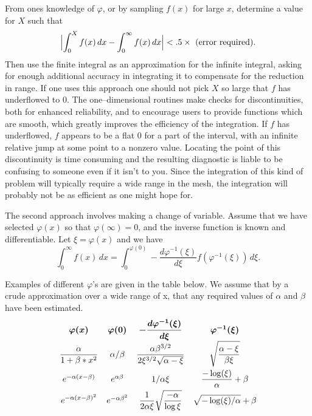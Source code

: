 \documentclass[twoside]{MATH77}
\begin{document}
From ones knowledge of $\varphi $, or by sampling $f(x)$ for large $x$,
determine a value for $X$ such that
\begin{equation*}
\Bigl| \int_0^X f(x)\,dx - \int_0^\infty f(x)\,dx \Bigr| < .5
\times \text{ (error required).}
\end{equation*}
Then use the finite integral as an approximation for the infinite
integral, asking for enough additional accuracy in integrating it to
compensate for the reduction in range.  If one uses this approach one
should not pick $X$ so large that $f$ has underflowed to 0.  The
one--dimensional routines make checks for discontinuities, both for
enhanced reliability, and to encourage users to provide functions
which are smooth, which greatly improves the efficiency of the
integration.  If $f$ has underflowed, $f$ appears to be a flat 0 for
a part of the interval, with an infinite relative jump at some point
to a nonzero value.  Locating the point of this discontinuity is time
consuming and the resulting diagnostic is liable to be confusing to
someone even if it isn't to you.  Since the integration of this kind
of problem will typically require a wide range in the mesh, the
integration will probably not be as efficient as one might hope for.

The second approach involves making a change of variable.  Assume that
we have selected $\varphi (x)$ so that $\varphi (\infty) = 0$, and the
inverse function is known and differentiable.  Let $\xi = \varphi (x)$
and we have
\begin{equation*}
\int_0^\infty f(x)\,dx = \int_0^{\varphi (0)} -\frac {d\varphi ^{-1}(\xi)}{d\xi}
f(\varphi ^{-1}(\xi))\,d\xi.
\end{equation*}

Examples of different $\varphi $'s are given in the table below.  We
assume that by a crude approximation over a wide range of x, that any
required values of $\alpha$ and $\beta$ have been estimated.
\begin{equation*}
\begin{array}{cccc}
\bm{\varphi (x)} & \bm{\varphi (0)} & \displaystyle
\bm{-\frac {d\varphi ^{-1}(\xi)}{d\xi}} & \bm{\varphi
^{-1}(\xi)}\rule[-10pt]{0pt}{15pt}\\
\displaystyle \frac \alpha{1+\beta*x^2} & \alpha/\beta &
\displaystyle  \frac{\alpha \beta^{3/2}}{2 \xi^{3/2}
  \sqrt{\alpha-\xi}} &
\displaystyle {\sqrt{\frac{\alpha - \xi}{\beta \xi}}}
\rule[-15pt]{0pt}{20pt} \\
e^{-\alpha (x - \beta)} & e^{\alpha \beta} & 1/\alpha \xi &
{\displaystyle \frac{-\log(\xi)}{\alpha}} + \beta \rule[-10pt]{0pt}{15pt} \\
\displaystyle e^{-\alpha (x-\beta)^2} & e^{-\alpha \beta^2} &
\displaystyle \frac{1}{2 \alpha \xi}\sqrt{\frac{-\alpha}{\log \xi}} &
\displaystyle \sqrt{-\log(\xi)/\alpha} + \beta
\end{array}
\end{equation*}
\end{document}
